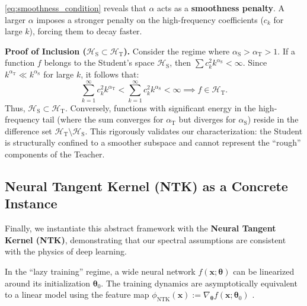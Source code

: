 \documentclass{article}
\theoremstyle{definition}
\theoremstyle{definition}
\theoremstyle{plain}
\theoremstyle{plain}
\theoremstyle{plain}
\theoremstyle{plain}
\theoremstyle{plain}
\newcommand{\te}{\mathrm{T}}
\newcommand{\st}{\mathrm{S}}
\begin{document}
\eqref{eq:smoothness_condition} reveals that $\alpha$ acts as a \textbf{smoothness penalty}. A larger $\alpha$ imposes a stronger penalty on the high-frequency coefficients ($c_k$ for large $k$), forcing them to decay faster.

\textbf{Proof of Inclusion ($\mathcal{H}_\st \subset \mathcal{H}_\te$).} 
Consider the regime where $\alpha_\st > \alpha_\te > 1$. If a function $f$ belongs to the Student's space $\mathcal{H}_\st$, then $\sum c_k^2 k^{\alpha_\st} < \infty$. Since $k^{\alpha_\te} \ll k^{\alpha_\st}$ for large $k$, it follows that:
\begin{equation}
    \sum_{k=1}^\infty c_k^2 k^{\alpha_\te} < \sum_{k=1}^\infty c_k^2 k^{\alpha_\st} < \infty \implies f \in \mathcal{H}_\te.
\end{equation}
Thus, $\mathcal{H}_\st \subset \mathcal{H}_\te$. Conversely, functions with significant energy in the high-frequency tail (where the sum converges for $\alpha_\te$ but diverges for $\alpha_\st$) reside in the difference set $\mathcal{H}_\te \setminus \mathcal{H}_\st$. This rigorously validates our characterization: the Student is structurally confined to a smoother subspace and cannot represent the ``rough'' components of the Teacher.

\subsection{Neural Tangent Kernel (NTK) as a Concrete Instance}
\label{app:sub:ntk_derivation}

Finally, we instantiate this abstract framework with the \textbf{Neural Tangent Kernel (NTK)}, demonstrating that our spectral assumptions are consistent with the physics of deep learning.

In the ``lazy training'' regime, a wide neural network $f(\mathbf{x}; \boldsymbol{\theta})$ can be linearized around its initialization $\boldsymbol{\theta}_0$. The training dynamics are asymptotically equivalent to a linear model using the feature map $\phi_{\text{NTK}}(\mathbf{x}) := \nabla_{\boldsymbol{\theta}} f(\mathbf{x}; \boldsymbol{\theta}_0)$ \citep{jacot2018neural}.
\end{document}
